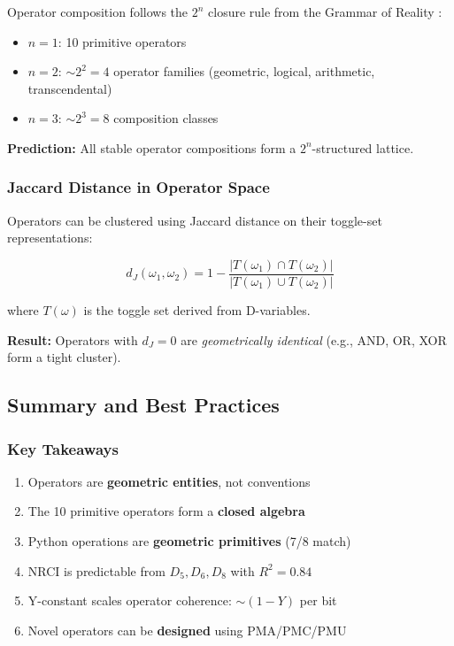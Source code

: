 Operator composition follows the $2^n$ closure rule from the Grammar of Reality \cite{Grammar_Reality}:

\begin{itemize}
    \item $n=1$: 10 primitive operators
    \item $n=2$: $\sim 2^2 = 4$ operator families (geometric, logical, arithmetic, transcendental)
    \item $n=3$: $\sim 2^3 = 8$ composition classes
\end{itemize}

\textbf{Prediction:} All stable operator compositions form a $2^n$-structured lattice.

\subsubsection{Jaccard Distance in Operator Space}

Operators can be clustered using Jaccard distance on their toggle-set representations:

\begin{equation}
d_J(\omega_1, \omega_2) = 1 - \frac{|T(\omega_1) \cap T(\omega_2)|}{|T(\omega_1) \cup T(\omega_2)|}
\end{equation}

where $T(\omega)$ is the toggle set derived from D-variables.

\textbf{Result:} Operators with $d_J = 0$ are \emph{geometrically identical} (e.g., AND, OR, XOR form a tight cluster).

\subsection{Summary and Best Practices}

\subsubsection{Key Takeaways}

\begin{enumerate}
    \item Operators are \textbf{geometric entities}, not conventions
    \item The 10 primitive operators form a \textbf{closed algebra}
    \item Python operations are \textbf{geometric primitives} (7/8 match)
    \item NRCI is predictable from $D_5, D_6, D_8$ with $R^2 = 0.84$
    \item Y-constant scales operator coherence: $\sim (1-Y)$ per bit
    \item Novel operators can be \textbf{designed} using PMA/PMC/PMU
\end{enumerate}

